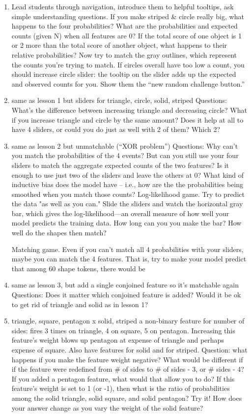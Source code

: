 \documentclass[11pt,letterpaper]{article}
\begin{document}
\begin{enumerate}
\item 
 Lead students through navigation, introduce them to helpful tooltips, ask simple understanding questions. If you make striped \& circle really big, what happens to the four probabilities?  What are the probabilities and expected counts (given N) when all features are 0?  If the total score of one object is 1 or 2 more than the total score of another object, what happens to their relative probabilities? Now try to match the gray outlines, which represent the counts you’re trying to match.  If circles overall have too low a count, you should increase circle slider: the tooltip on the slider adds up the expected and observed counts for you.  Show them the “new random challenge button.”  
\item same as lesson 1 but sliders for triangle, circle, solid, striped
Questions: What’s the difference between increasing triangle and decreasing circle?  What if you increase triangle and circle by the same amount?  Does it help at all to have 4 sliders, or could you do just as well with 2 of them? Which 2?
\item same as lesson 2 but unmatchable (“XOR problem”)
Questions: Why can’t you match the probabilities of the 4 events? But can you still use your four sliders to match the aggregate expected counts of the two features?  Is it enough to use just two of the sliders and leave the others at 0?  What kind of inductive bias does the model have -- i.e., how are the the probabilities being smoothed when you match those counts?    
Log-likelihood game. Try to predict the data "as well as you can." Slide the sliders and watch the horizontal gray bar, which gives the log-likelihood—an overall measure of how well your model predicts the training data. How long can you you make the bar? How well do the shapes then match?

Matching game. Even if you can't match all 4 probabilities with your sliders, maybe you can match the 4 features. That is, try to make your model predict that among 60 shape tokens, there would be
\item same as lesson 3, but add a single conjoined feature so it’s matchable again Questions: Does it matter which conjoined feature is added?  Would it be ok to get rid of triangle and solid as in lesson 1?
\item {triangle, square, pentagon} x {solid, striped}
a non-binary feature for number of sides: fires 3 times on triangle, 4 on square, 5 on pentagon.  Increasing this feature’s weight blows up pentagon at expense of triangle and perhaps expense of square.  Also have features for solid and for striped.
Question: what happens if you make the feature weight negative?  What would be different if if the feature were redefined from \# of sides to \# of sides - 3, or \# sides - 4?  If you added a pentagon feature, what would that allow you to do?
If this feature's weight is set to 1 (or -1), then what is the ratio of probabilities among the solid triangle, solid square, and solid pentagon? Try it! How does your answer change as you vary the weight of the solid feature?


\end{enumerate}
\end{document}
